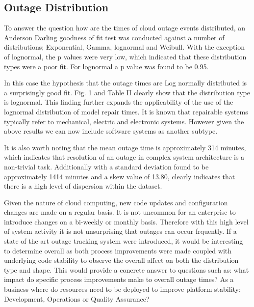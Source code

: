 \documentclass[conference]{IEEEtran}
\begin{document}
\subsection{Outage Distribution}

To answer the question how are the times of cloud outage events distributed, an Anderson Darling goodness of fit test was conducted against a number of distributions; Exponential, Gamma, lognormal and Weibull. With the exception of lognormal,  the p values were very low, which indicated that these distribution types were a poor fit. For lognormal a p value was found to be 0.95. \par

In this case the hypothesis that the outage times are Log normally distributed is a surprisingly good fit. Fig. 1 and Table II clearly show that the distribution type is lognormal. This finding further expands the applicability of the use of the lognormal distribution of model repair times. It is known that repairable systems typically refer to mechanical, electric and electronic systems. However given the above results we can now include software systems as another subtype.\par

It is also worth noting that the mean outage time is approximately 314 minutes, which indicates that resolution of an outage in complex system architecture is a non-trivial task. Additionally with a standard deviation found to be approximately 1414 minutes and a skew value of 13.80, clearly indicates that there is a high level of dispersion within the dataset. \par

Given the nature of cloud computing, new code updates and configuration changes are made on a regular basis. It is not uncommon for an enterprise to introduce changes on a bi-weekly or monthly basis. Therefore with this high level of system activity it is not unsurprising that outages can occur frquently. If a state of the art outage tracking system were introduced, it would be interesting to determine overall as both process improvements were made coupled with underlying code stability to observe the overall affect on both the distribution type and shape. This would provide a concrete answer to questions such as: what impact do specific process improvements make to overall outage times? As a business where do resources need to be deployed to improve platform stability: Development, Operations or Quality Assurance? \par
\end{document}
